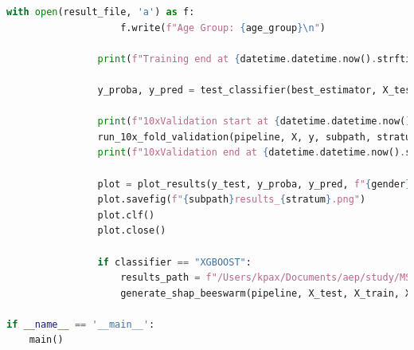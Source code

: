 \documentclass[12pt]{report}
\begin{document}
\begin{lstlisting}[language=Python,caption={ML\_stratified\_central.py: Κεντρικό σενάριο μάθησης και εκτέλεσης ταξινομητών}, label=lst:mlstratifiedcentral]
                with open(result_file, 'a') as f:
                    f.write(f"Age Group: {age_group}\n")

                print(f"Training end at {datetime.datetime.now().strftime('%Y-%m-%d %H:%M:%S')}")

                y_proba, y_pred = test_classifier(best_estimator, X_test, y_test, result_file)

                print(f"10xValidation start at {datetime.datetime.now().strftime('%Y-%m-%d %H:%M:%S')}")
                run_10x_fold_validation(pipeline, X, y, subpath, stratum, f"{gender}, {age_group}, {classifier} - SMOTE={use_smote}", groups=ppmi_ad_subset.obs['Patient'])
                print(f"10xValidation end at {datetime.datetime.now().strftime('%Y-%m-%d %H:%M:%S')}")

                plot = plot_results(y_test, y_proba, y_pred, f"{gender}, {age_group}, {classifier} - SMOTE={use_smote}")
                plot.savefig(f"{subpath}results_{stratum}.png")
                plot.clf()
                plot.close()

                if classifier == "XGBOOST":
                    results_path = f"/Users/kpax/Documents/aep/study/MSC/lab/PPMI_Project_133_RNASeq/data/ml/classification/{classifier}/deg_classification/shap"
                    generate_shap_beeswarm(pipeline, X_test, X_train, X.columns.tolist(), symbol_ensembl_mapping, results_path, f"{gender}_{age_group}_useSMOTE_{use_smote}", classifier)

if __name__ == '__main__':
    main()        
    \end{lstlisting}
\end{document}

